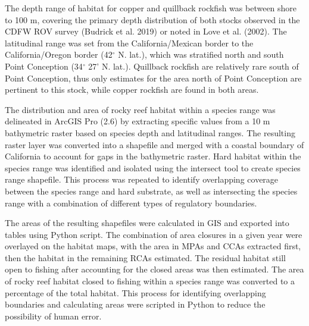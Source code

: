\documentclass[11pt,
  english,
  a4paper,
]{article}
\begin{document}
The depth range of habitat for copper and quillback rockfish was between shore to 100 m, covering the primary depth distribution of both stocks observed in the CDFW ROV survey {(Budrick et al. 2019)\leavevmode\tagmcend\tagstructend} or noted in Love et al. {(2002)\leavevmode\tagmcend\tagstructend}. The latitudinal range was set from the California/Mexican border to the California/Oregon border (42{\(^\circ\)\leavevmode\tagmcend\tagstructend} N. lat.), which was stratified north and south Point Conception (34{\(^\circ\)\leavevmode\tagmcend\tagstructend} 27' N. lat.). Quillback rockfish are relatively rare south of Point Conception, thus only estimates for the area north of Point Conception are pertinent to this stock, while copper rockfish are found in both areas.

\leavevmode\tagmcend\tagstructend\par


The distribution and area of rocky reef habitat within a species range was delineated in ArcGIS Pro (2.6) by extracting specific values from a 10 m bathymetric raster based on species depth and latitudinal ranges. The resulting raster layer was converted into a shapefile and merged with a coastal boundary of California to account for gaps in the bathymetric raster. Hard habitat within the species range was identified and isolated using the intersect tool to create species range shapefile. This process was repeated to identify overlapping coverage between the species range and hard substrate, as well as intersecting the species range with a combination of different types of regulatory boundaries.

\leavevmode\tagmcend\tagstructend\par


The areas of the resulting shapefiles were calculated in GIS and exported into tables using Python script. The combination of area closures in a given year were overlayed on the habitat maps, with the area in MPAs and CCAs extracted first, then the habitat in the remaining RCAs estimated. The residual habitat still open to fishing after accounting for the closed areas was then estimated. The area of rocky reef habitat closed to fishing within a species range was converted to a percentage of the total habitat. This process for identifying overlapping boundaries and calculating areas were scripted in Python to reduce the possibility of human error.
\end{document}
